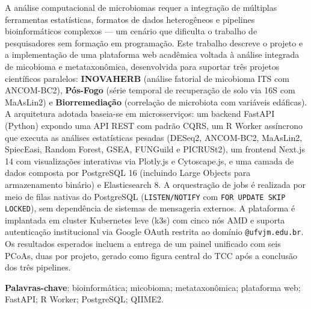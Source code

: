 \begin{resumo}

A análise computacional de microbiomas requer a integração de múltiplas
ferramentas estatísticas, formatos de dados heterogêneos e pipelines
bioinformáticos complexos — um cenário que dificulta o trabalho de
pesquisadores sem formação em programação. Este trabalho descreve o
projeto e a implementação de uma plataforma web acadêmica voltada à
análise integrada de micobioma e metataxonômica, desenvolvida para
suportar três projetos científicos paralelos: \textbf{INOVAHERB}
(análise fatorial de micobioma ITS com ANCOM-BC2), \textbf{Pós-Fogo}
(série temporal de recuperação de solo via 16S com MaAsLin2) e
\textbf{Biorremediação} (correlação de microbiota com variáveis
edáficas). A arquitetura adotada baseia-se em microsserviços: um
backend FastAPI (Python) expondo uma API REST com padrão CQRS, um R
Worker assíncrono que executa as análises estatísticas pesadas
(DESeq2, ANCOM-BC2, MaAsLin2, SpiecEasi, Random Forest, GSEA,
FUNGuild e PICRUSt2), um frontend Next.js 14 com visualizações
interativas via Plotly.js e Cytoscape.js, e uma camada de dados
composta por PostgreSQL 16 (incluindo Large Objects para armazenamento binário) e Elasticsearch 8. A orquestração
de jobs é realizada por meio de filas nativas do PostgreSQL
(\texttt{LISTEN/NOTIFY} com \texttt{FOR UPDATE SKIP LOCKED}), sem
dependência de sistemas de mensageria externos. A plataforma é
implantada em cluster Kubernetes leve (k3s) com cinco nós AMD e
suporta autenticação institucional via Google OAuth restrita ao domínio
\texttt{@ufvjm.edu.br}. Os resultados esperados incluem a entrega de um
painel unificado com seis PCoAs, duas por projeto, gerado como figura
central do TCC após a conclusão dos três pipelines.

\vspace{\onelineskip}
\noindent
\textbf{Palavras-chave}: bioinformática; micobioma; metataxonômica; plataforma web; FastAPI; R Worker; PostgreSQL; QIIME2.

\end{resumo}
